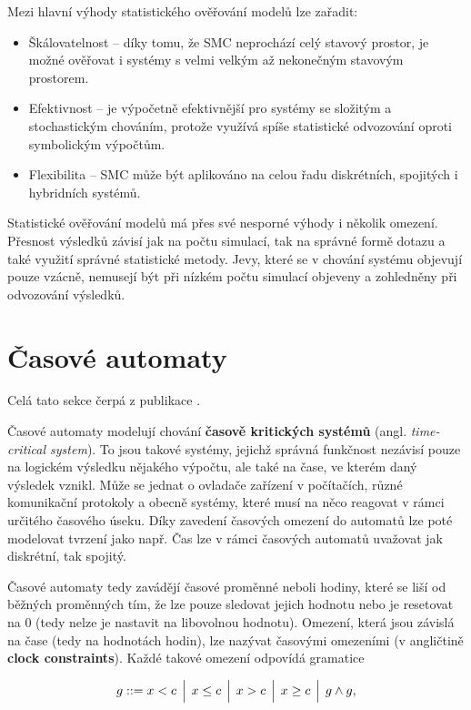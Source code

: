 Mezi hlavní výhody statistického ověřování modelů lze zařadit:
\begin{itemize}
    \item Škálovatelnost -- díky tomu, že SMC neprochází celý stavový prostor, je možné ověřovat i systémy s velmi velkým až nekonečným stavovým prostorem.
    \item Efektivnost -- je výpočetně efektivnější pro systémy se složitým a stochastickým chováním, protože využívá spíše statistické odvozování oproti symbolickým výpočtům.
    \item Flexibilita -- SMC může být aplikováno na celou řadu diskrétních, spojitých i hybridních systémů.
\end{itemize}

Statistické ověřování modelů má přes své nesporné výhody i několik omezení. Přesnost výsledků závisí jak na počtu simulací, tak na správné formě dotazu a také využití správné statistické metody. Jevy, které se v chování systému objevují pouze vzácně, nemusejí být při nízkém počtu simulací objeveny a zohledněny při odvozování výsledků.

\section{Časové automaty}
Celá tato sekce čerpá z publikace \cite{mc_principles}. 

Časové automaty modelují chování \textbf{časově kritických systémů} (angl. \textit{time-critical system}). To jsou takové systémy, jejichž správná funkčnost nezávisí pouze na logickém výsledku nějakého výpočtu, ale také na čase, ve kterém daný výsledek vznikl. Může se jednat o ovladače zařízení v počítačích, různé komunikační protokoly a obecně systémy, které musí na něco reagovat v rámci určitého časového úseku. Díky zavedení časových omezení do automatů lze poté modelovat tvrzení jako např.  Čas lze v rámci časových automatů uvažovat jak diskrétní, tak spojitý.

Časové automaty tedy zavádějí časové proměnné neboli hodiny, které se liší od běžných proměnných tím, že lze pouze sledovat jejich hodnotu nebo je resetovat na 0 (tedy nelze je nastavit na libovolnou hodnotu). Omezení, která jsou závislá na čase (tedy na hodnotách hodin), lze nazývat časovými omezeními (v angličtině \textbf{clock constraints}). Každé takové omezení odpovídá gramatice

\begin{equation*}
    g ::= x < c \hspace{0.15cm} \Big| \hspace{0.15cm} x \leq c \hspace{0.15cm} \Big| \hspace{0.15cm} x > c \hspace{0.15cm} \Big| \hspace{0.15cm} x \geq c \hspace{0.15cm} \Big| \hspace{0.15cm} g \wedge g,
\end{equation*}

